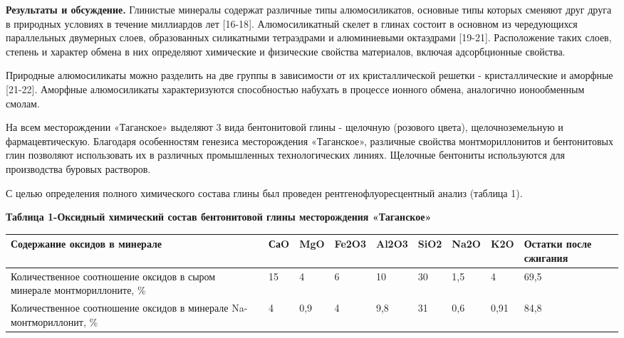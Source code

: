\begin{multicols}{2}
{\bfseries Результаты и обсуждение.} Глинистые минералы содержат различные
типы алюмосиликатов, основные типы которых сменяют друг друга в
природных условиях в течение миллиардов лет {[}16-18{]}. Алюмосиликатный
скелет в глинах состоит в основном из чередующихся параллельных
двумерных слоев, образованных силикатными тетраэдрами и алюминиевыми
октаэдрами {[}19-21{]}. Расположение таких слоев, степень и характер
обмена в них определяют химические и физические свойства материалов,
включая адсорбционные свойства.

Природные алюмосиликаты можно разделить на две группы в зависимости от
их кристаллической решетки - кристаллические и аморфные {[}21-22{]}.
Аморфные алюмосиликаты характеризуются способностью набухать в процессе
ионного обмена, аналогично ионообменным смолам.

На всем месторождении «Таганское» выделяют 3 вида бентонитовой глины -
щелочную (розового цвета), щелочноземельную и фармацевтическую.
Благодаря особенностям генезиса месторождения «Таганское», различные
свойства монтмориллонитов и бентонитовых глин позволяют использовать их
в различных промышленных технологических линиях. Щелочные бентониты
используются для производства буровых растворов.

С целью определения полного химического состава глины был проведен
рентгенофлуоресцентный анализ (таблица 1).
\end{multicols}

{\bfseries Таблица 1-Оксидный химический состав бентонитовой глины
месторождения «Таганское»}

\begin{table}[H]
\centering
\begin{tabular}{|p{}|l|l|l|l|l|l|l|p{}|}
\hline
\textbf{Содержание оксидов в минерале} & \textbf{СаO} & \textbf{MgO} & \textbf{Fe2O3} & \textbf{Al2O3} & \textbf{SiO2} & \textbf{Na2O} & \textbf{K2O} & \textbf{Остатки после сжигания} \\ \hline
Количественное соотношение оксидов в сыром минерале монтмориллоните, \% & 15 & 4 & 6 & 10 & 30 & 1,5 & 4 & 69,5 \\ \hline
Количественное соотношение оксидов в минерале Na-монтмориллонит, \% & 4 & 0,9 & 4 & 9,8 & 31 & 0,6 & 0,91 & 84,8 \\ \hline
\end{tabular}
\end{table}

